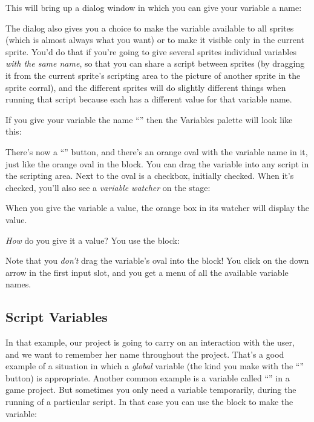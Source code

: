 \documentclass{report}
\begin{document}
This will bring up a dialog window in which you can give your variable a name:\nopagebreak


The dialog also gives you a choice to make the variable available to all sprites (which is almost always what you want) or to make it visible only in the current sprite. You'd do that if you're going to give several sprites individual variables \emph{with the same name}, so that you can share a script between sprites (by dragging it from the current sprite's scripting area to the picture of another sprite in the sprite corral), and the different sprites will do slightly different things when running that script because each has a different value for that variable name.

If you give your variable the name ``'' then the Variables palette will look like this:\nopagebreak


There's now a ``'' button, and there's an orange oval with the variable name in it, just like the orange oval in the  block. You can drag the variable into any script in the scripting area. Next to the oval is a checkbox, initially checked. When it's checked, you'll also see a \emph{variable watcher} on the stage:\nopagebreak


When you give the variable a value, the orange box in its watcher will display the value.

\emph{How} do you give it a value? You use the  block:\nopagebreak


Note that you \emph{don't} drag the variable's oval into the  block! You click on the down arrow in the first input slot, and you get a menu of all the available variable names.

\subsection{Script Variables}

In that example, our project is going to carry on an interaction with the user, and we want to remember her name throughout the project. That's a good example of a situation in which a \emph{global} variable (the kind you make with the ``'' button) is appropriate. Another common example is a variable called ``'' in a game project. But sometimes you only need a variable temporarily, during the running of a particular script. In that case you can use the  block to make the variable:\nopagebreak
\end{document}
